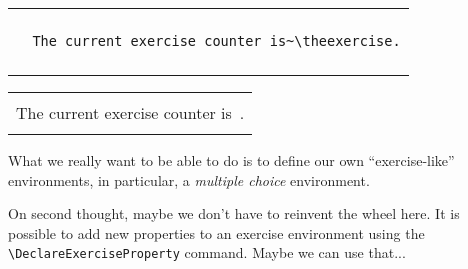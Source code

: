 \documentclass{article}
\newenvironment{myBlock}
    {\begin{center}
    \begin{tabular}{|p{0.9\textwidth}|}
    \hline\\
    }
    {
    \\\\\hline
    \end{tabular}
    \end{center}
    }
\begin{document}
\begin{myBlock}
\begin{verbatim}
  The current exercise counter is~\theexercise.
\end{verbatim}
\end{myBlock}

\begin{myBlock}
  The current exercise counter is~\theexercise.
\end{myBlock}

What we really want to be able to do is to define our own ``exercise-like'' environments, in particular, a \emph{multiple choice} environment.

On second thought, maybe we don't have to reinvent the wheel here.
It is possible to add new properties to an exercise environment using the \verb'\DeclareExerciseProperty' command.  Maybe we can use that... 
\end{document}
